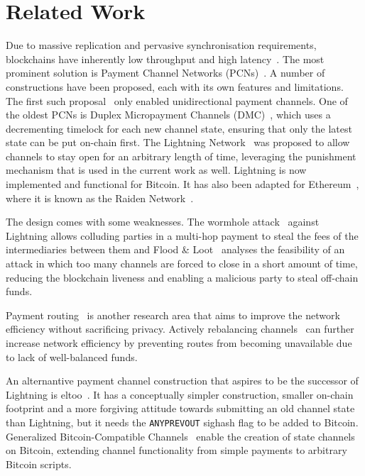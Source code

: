 \section{Related Work}
  Due to massive replication and pervasive synchronisation requirements,
  blockchains have inherently low throughput and high latency~\cite{scaling}.
  The most prominent solution is Payment Channel Networks
  (PCNs)~\cite{DBLP:conf/fc/GudgeonMRMG20}. A number of constructions have been
  proposed, each with its own features and limitations. The first such
  proposal~\cite{spilman} only enabled unidirectional payment channels. One of
  the oldest PCNs is Duplex Micropayment Channels (DMC)~\cite{decker}, which
  uses a decrementing timelock for each new channel state, ensuring that only
  the latest state can be put on-chain first. The Lightning
  Network~\cite{lightning} was proposed to allow channels to stay open for an
  arbitrary length of time, leveraging the punishment mechanism that is used in
  the current work as well. Lightning is now implemented and functional for
  Bitcoin. It has also been adapted for Ethereum~\cite{wood2014ethereum}, where
  it is known as the Raiden Network~\cite{raiden}.

  The design comes with some weaknesses. The wormhole
  attack~\cite{DBLP:conf/ndss/MalavoltaMSKM19} against Lightning allows
  colluding parties in a multi-hop payment to steal the fees of the
  intermediaries between them and Flood \& Loot~\cite{10.1145/3419614.3423248}
  analyses the feasibility of an attack in which too many channels are forced to
  close in a short amount of time, reducing the blockchain liveness and enabling
  a malicious party to steal off-chain funds.

  Payment routing~\cite{spider,prihodko2016flare,lee2020routee} is another
  research area that aims to improve the network efficiency without sacrificing
  privacy. Actively rebalancing channels~\cite{DBLP:conf/ccs/KhalilG17} can
  further increase network efficiency by preventing routes from becoming
  unavailable due to lack of well-balanced funds.

  An alternantive payment channel construction that aspires to be the successor
  of Lightning is eltoo~\cite{eltoo}. It has a conceptually simpler
  construction, smaller on-chain footprint and a more forgiving attitude towards
  submitting an old channel state than Lightning, but it needs the
  \texttt{ANYPREVOUT} sighash flag to be added to Bitcoin. Generalized
  Bitcoin-Compatible Channels~\cite{cryptoeprint:2020:476} enable the creation
  of state channels on Bitcoin, extending channel functionality from simple
  payments to arbitrary Bitcoin scripts.

